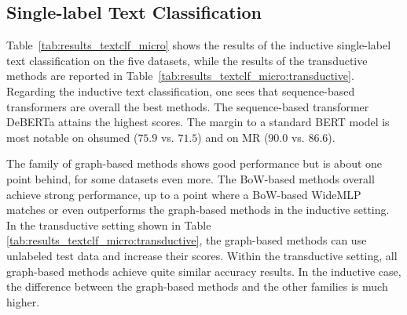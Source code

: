\documentclass[acmsmall,nonacm]{acmart}
\newcommand{\mlp}{WideMLP\xspace}
\newcommand{\mytextsubscript}[1]{{\color{black}\textsubscript{#1}}}
\newcommand{\myheader}{}
\begin{document}
\subsection{Single-label Text Classification}

\renewcommand{\mytextsubscript}[1]{{\color{black}~\textsubscript{#1}}}
\newcommand\mycaption{Results for the inductive training on the single-label
text classification datasets. For our experiments, we report the mean accuracy
and standard deviation (SD) over five runs. For numbers from the literature, we
report the SD if available. GPT-3 methods use 16 examples per class for
in-context learning, and the (R.S)-variant uses a RoBERTa sampler to select
these examples. Column ``Provenance'' reports the source. d.\,f. is short for the use of a different variant of the dataset or a different split, and thus, the number is omitted to ensure comparability.}
\newcommand\mylabel{\label{tab:results_textclf_micro}}


Table~\ref{tab:results_textclf_micro} shows the results of the inductive single-label text classification on the five datasets, while the results of the transductive methods are reported in Table~\ref{tab:results_textclf_micro:transductive}.
Regarding the inductive text classification, one sees that sequence-based transformers are overall the best methods.
The sequence-based transformer DeBERTa attains the highest scores. 
The margin to a standard BERT model is most notable on ohsumed ($75.9$ vs. $71.5$) and on MR ($90.0$ vs. $86.6$).

The family of graph-based methods shows good performance but is about one point behind, for some datasets even more.
The BoW-based methods overall achieve strong performance,
up to a point where a BoW-based \mlp matches or even outperforms the graph-based methods in the inductive setting.
In the transductive setting shown in Table~ \ref{tab:results_textclf_micro:transductive}, the graph-based methods can use unlabeled test data and increase their scores.
Within the transductive setting, all graph-based methods achieve quite similar accuracy results.
In the inductive case, the difference between the graph-based methods and the other families is much higher.

\renewcommand{\myheader}{
\caption{Results for the single-label text classification datasets.
    Note that only graph-based methods require the transductive setting.
    We report mean accuracy and standard deviation over five runs.
    The column ``Provenance'' reports the source.}\label{tab:results_textclf_micro:transductive}
 }

\end{document}
